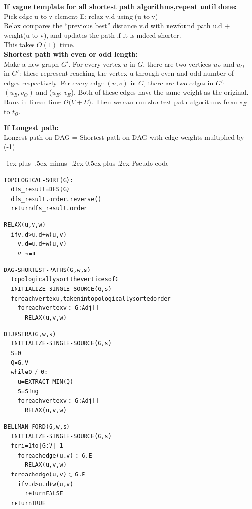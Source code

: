 \documentclass[10pt,landscape]{article}
\makeatletter
\renewcommand{\section}{\@startsection{section}{1}{0mm}%
                                {-1ex plus -.5ex minus -.2ex}%
                                {0.5ex plus .2ex}%
                                {\normalfont\large\bfseries}}
\makeatother
\begin{document}
\begin{multicols}{3}
\textbf{If vague template for all shortest path algorithms,repeat until done:} \\
Pick edge u to v element E: relax v.d using (u to v) \\
Relax compares the “previous best” distance v.d with newfound path u.d + weight(u to v), and updates the path if it is indeed shorter. \\
This takes $O(1)$ time.\\

\textbf{Shortest path with even or odd length:} \\
Make a new graph $G'$. For every vertex $u$ in $G$, there are two vertices $u_E$ and $u_O$ in $G'$: these represent reaching the vertex u through even and odd number of edges respectively. For every edge $(u, v)$ in $G$, there are two edges in $G'$: $(u_E, v_O)$ and ($u_E$; $v_E$). Both of these edges have the same weight as the original. \\
Runs in linear time $O(V + E$). Then we can run shortest path algorithms from $s_E$ to $t_O$.

\textbf{If Longest path:} \\
Longest path on DAG = Shortest path on DAG with edge weights multiplied by (-1)

\section{Pseudo-code}
\begin{alltt}

TOPOLOGICAL-SORT(G): 
\ \	dfs_result = DFS(G) 
\ \	dfs_result.order.reverse() 
\ \	return dfs_result.order

RELAX(u,v,w)
\ \	if v.d > u.d + w(u,v)
\ \	\ \	v.d = u.d + w(u,v)
\ \	\ \	v.\(\pi\) = u

DAG-SHORTEST-PATHS(G,w,s)
\ \	topologically sort the vertices of G
\ \	INITIALIZE-SINGLE-SOURCE(G,s)
\ \	for each vertex u, taken in topologically sorted order 
\ \	\ \	for each vertex v \(\in\) G:Adj[]
\ \	\ \	\ \	RELAX(u,v,w)

DIJKSTRA(G,w,s)
\ \	INITIALIZE-SINGLE-SOURCE(G,s)
\ \	S = 0	
\ \	Q = G.V 
\ \	while Q \(\neq\) 0: 
\ \	\ \	u = EXTRACT-MIN(Q) 
\ \	\ \	S = S fug 
\ \	\ \	for each vertex v \(\in\) G:Adj[]
\ \	\ \	\ \	RELAX(u,v,w)

BELLMAN-FORD(G,w,s)
\ \	INITIALIZE-SINGLE-SOURCE(G,s)
\ \	for i=1 to |G:V| - 1
\ \	\ \	for each edge (u,v) \(\in\) G.E
\ \	\ \	\ \	RELAX(u,v,w)
\ \	for each edge (u,v) \(\in\) G.E
\ \	\ \	if v.d > u.d + w(u,v)
\ \	\ \	\ \	return FALSE
\ \	return TRUE


\end{alltt}
\end{multicols}
\end{document}
